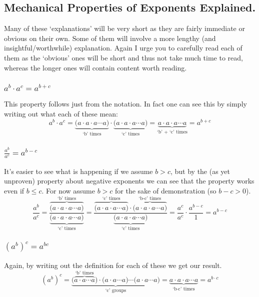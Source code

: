 \documentclass{ximera}
\begin{document}
\subsection*{Mechanical Properties of Exponents Explained.}
    Many of these `explanations' will be very short as they are fairly immediate or obvious on their own. Some of them will involve a more lengthy (and insightful/worthwhile) explanation. Again I urge you to carefully read each of them as the `obvious' ones will be short and thus not take much time to read, whereas the longer ones will contain content worth reading.
    
    \subsubsection*{$a^b \cdot a^c = a^{b+c}$}
    
        This property follows just from the notation. In fact one can see this by simply writing out what each of these mean:
        \[
            a^b\cdot a^c = \underbrace{\big(a\cdot a\cdot a \cdots a\big)}_\text{`b' times}\cdot 
                \underbrace{\big(a\cdot a\cdot a \cdots a\big)}_\text{`c' times} =
                \underbrace{a\cdot a\cdot a \cdots a}_\text{`b' + `c' times} = a^{b+c}
        \]
    
    \subsubsection*{$\frac{a^b}{a^c} = a^{b-c}$}
        
        It's easier to see what is happening if we assume $b > c$, but by the (as yet unproven) property about negative exponents we can see that the property works even if $b \leq c$. For now assume $b > c$ for the sake of demonstration (so $b-c > 0$).
        \[
            \frac{a^b}{a^c} = 
                \frac{\overbrace{\big(a\cdot a\cdot a \cdots a\big)}^\text{`b' times}}{
                \underbrace{\big(a\cdot a\cdot a \cdots a\big)}_\text{`c' times}} =
                \frac{\overbrace{\big(a\cdot a\cdot a \cdots a\big)}^\text{`c' times}\cdot\overbrace{\big(a\cdot a\cdot a \cdots a\big)}^\text{`b-c' times}}{
                \underbrace{\big(a\cdot a\cdot a \cdots a\big)}_\text{`c' times}} =
                \frac{a^c}{a^c}\cdot \frac{a^{b-c}}{1} = a^{b-c}
        \]
    
    \subsubsection*{$\left(a^b\right)^c = a^{bc}$}
        Again, by writing out the definition for each of these we get our result.
        \[
            \left(a^b\right)^c = 
                \underbrace{\big(\overbrace{a \cdot a \cdots a}^\text{`b' times}\big)\cdot \big(a \cdot a \cdots a\big) \cdots \big(a \cdot a \cdots a\big)}_\text{`c' groups} =
                \underbrace{a \cdot a \cdot a \cdots a}_{\text{`b} \cdot \text{c' times}} =
                a^{b\cdot c} 
        \]
        
\end{document}
